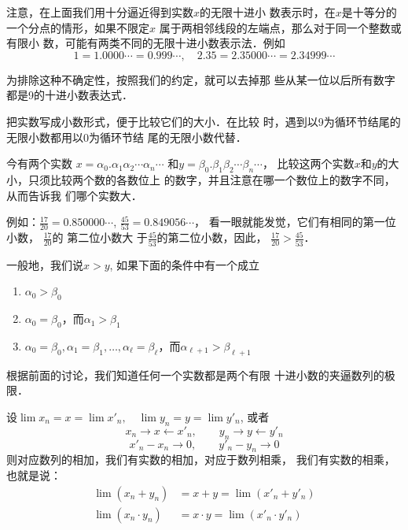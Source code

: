     注意，在上面我们用十分逼近得到实数$x$的无限十进小
    数表示时，在$x$是十等分的一个分点的情形，如果不限定$x$
    属于两相邻线段的左端点，那么对于同一个整数或有限小
    数，可能有两类不同的无限十进小数表示法．例如
\[1=1.0000\cdots=0.999\cdots,\quad 2.35=2.35000\cdots=2.34999\cdots\]

    为排除这种不确定性，按照我们的约定，就可以去掉那
    些从某一位以后所有数字都是9的十进小数表达式．

把实数写成小数形式，便于比较它们的大小．在比较
时，遇到以9为循环节结尾的无限小数都用以0为循环节结
尾的无限小数代替．

今有两个实数
$x=\alpha_0.\alpha_1\alpha_2\cdots\alpha_n\cdots$ 和$y=\beta_0.\beta_1\beta_2\cdots\beta_n\cdots$，
比较这两个实数$x$和$y$的大小，只须比较两个数的各数位上
的数字，并且注意在哪一个数位上的数字不同，从而告诉我
们哪个实数大．


例如：$\frac{17}{20}=0.850000\cdots$, $\frac{45}{53}=0.849056\cdots$，
看一眼就能发觉，它们有相同的第一位小数，
$\frac{17}{20}$的 第二位小数大
于$\frac{45}{53}$的第二位小数，因此，
$\frac{17}{20}>\frac{45}{53}$．

一般地，我们说$x>y$, 如果下面的条件中有一个成立
\begin{enumerate}
    \item $\alpha_0>\beta_0$
    \item $\alpha_0=\beta_0$，而$\alpha_1>\beta_1$
    \item $\alpha_0=\beta_0, \alpha_1 =\beta_1,\ldots,\alpha_{\ell}=\beta_{\ell}$，而$\alpha_{\ell+1}>\beta_{\ell+1}$
\end{enumerate}

根据前面的讨论，我们知道任何一个实数都是两个有限
十进小数的夹逼数列的极限．

设$\lim x_n=x=\lim x'_n,\quad \lim y_n=y=\lim y'_n$,
或者
\[x_n\to x\leftarrow x'_n,\qquad y_n\to y\leftarrow y'_n\]
\[x'_n-x_n\to 0,\qquad y'_n-y_n\to 0\]
则对应数列的相加，我们有实数的相加，对应于数列相乘，
我们有实数的相乘，也就是说：
\[\begin{split}
    \lim(x_n+y_n)&=x+y=\lim(x'_n+y'_n)\\
    \lim(x_n\cdot y_n)&=x\cdot y=\lim(x'_n\cdot y'_n)
\end{split}
\]

